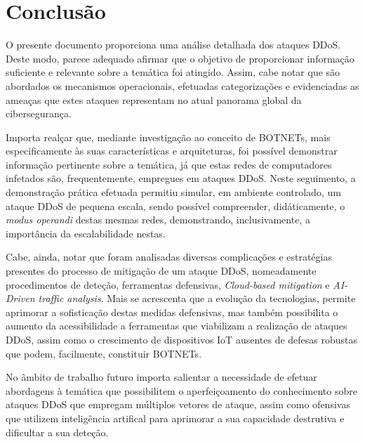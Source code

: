\section{Conclusão}
O presente documento proporciona uma análise detalhada dos ataques DDoS. Deste modo, parece adequado afirmar que o objetivo de proporcionar informação suficiente e relevante sobre a temática foi atingido. Assim, cabe notar que são abordados os mecanismos operacionais, efetuadas categorizações e evidenciadas as ameaças que estes ataques representam no atual panorama global da cibersegurança.


Importa realçar que, mediante investigação ao conceito de BOTNETs, mais especificamente às suas características e arquiteturas, foi possível demonstrar informação pertinente sobre a temática, já que estas redes de computadores infetados são, frequentemente, empregues em ataques DDoS. Neste seguimento, a demonstração prática efetuada permitiu simular, em ambiente controlado, um ataque DDoS de pequena escala, sendo possível compreender, didáticamente, o \textit{modus operandi} destas mesmas redes, demonstrando, inclusivamente, a importância da escalabilidade nestas.

Cabe, ainda, notar que foram analisadas diversas complicações e estratégias presentes do processo de mitigação de um ataque DDoS, nomeadamente procedimentos de deteção, ferramentas defensivas, \textit{Cloud-based mitigation} e \textit{AI-Driven traffic analysis}. Mais se acrescenta que a evolução da tecnologias, permite aprimorar a sofisticação destas medidas defensivas, mas também possibilita o aumento da acessibilidade a ferramentas que viabilizam a realização de ataques DDoS, assim como o crescimento de dispositivos IoT ausentes de defesas robustas que podem, facilmente, constituir BOTNETs.


No âmbito de trabalho futuro importa salientar a necessidade de efetuar abordagens à temática que possibilitem o aperfeiçoamento do conhecimento sobre ataques DDoS que empregam múltiplos vetores de ataque, assim como ofensivas que utilizem inteligência artifical para aprimorar a sua capacidade destrutiva e dificultar a sua deteção.